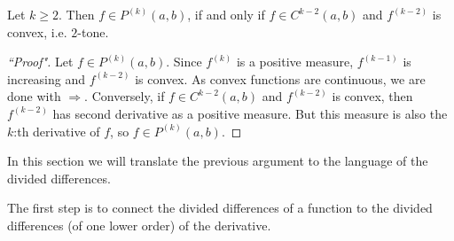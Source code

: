 \begin{lause}\label{k-tone_smooth}
	Let $k \geq 2$. Then $f \in P^{(k)}(a, b)$, if and only if $f \in C^{k - 2}(a, b)$ and $f^{(k - 2)}$ is convex, i.e. $2$-tone.
\end{lause}
\begin{proof}[``Proof"]
	Let $f \in P^{(k)}(a, b)$. Since $f^{(k)}$ is a positive measure, $f^{(k - 1)}$ is increasing and $f^{(k - 2)}$ is convex. As convex functions are continuous, we are done with $\Rightarrow$. Conversely, if $f \in C^{k - 2}(a, b)$ and $f^{(k - 2)}$ is convex, then $f^{(k - 2)}$ has second derivative as a positive measure. But this measure is also the $k$:th derivative of $f$, so $f \in P^{(k)}(a, b)$.
\end{proof}

In this section we will translate the previous argument to the language of the divided differences.

The first step is to connect the divided differences of a function to the divided differences (of one lower order) of the derivative.

